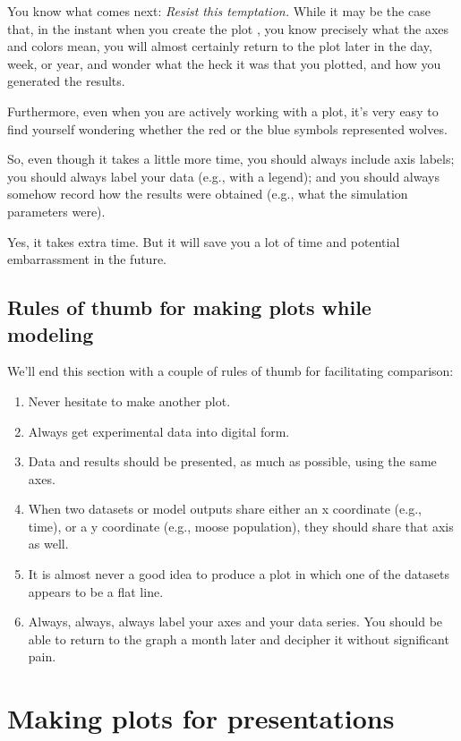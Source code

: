 \documentclass{tufte-handout}
\begin{document}
You know what comes next:  {\it Resist this temptation.}  While it may be the case that, in the instant when you create the plot , you know precisely what the axes and colors mean, you will almost certainly return to the plot later in the day, week, or year, and wonder what the heck it was that you plotted, and how you generated the results.  

Furthermore, even when you are actively working with a plot, it's very easy to find yourself wondering whether the red or the blue symbols represented wolves.

So, even though it takes a little more time, you should always include axis labels; you should always label your data (e.g., with a legend); and you should always somehow record how the results were obtained (e.g., what the simulation parameters were).   

Yes, it takes extra time.  But it will save you a lot of time and potential embarrassment in the future.

\subsection{Rules of thumb for making plots while modeling}

We'll end this section with a couple of rules of thumb for facilitating comparison:
\begin{enumerate}
\item Never hesitate to make another plot.
\item Always get experimental data into digital form.
\item Data and results should be presented, as much as possible, using the same axes.
\item When two datasets or model outputs share either an x coordinate (e.g., time), or a y coordinate (e.g., moose population), they should share that axis as well.
\item It is almost never a good idea to produce a plot in which one of the datasets appears to be a flat line.
\item Always, always, always label your axes and your data series.  You should be able to return to the graph a month later and decipher it without significant pain.
\end{enumerate}

\clearpage

\section{Making plots for presentations}
\end{document}
